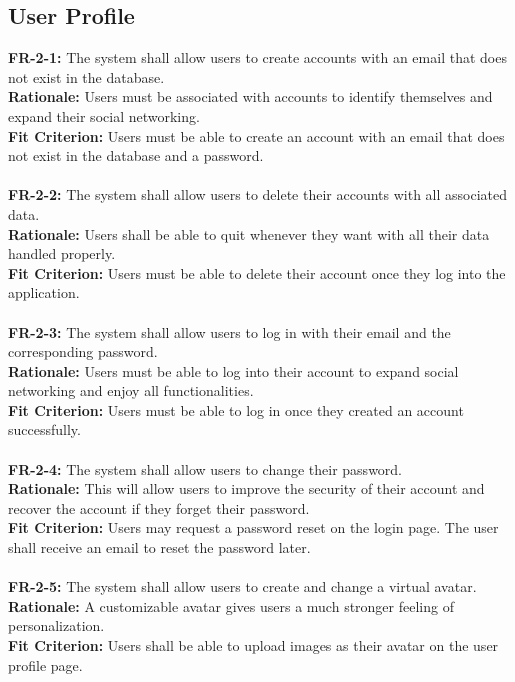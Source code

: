 \documentclass[12pt]{article}
\begin{document}
\subsection{User Profile}
    \textbf{FR-2-1:} The system shall allow users to create accounts with an email that does not exist in the database.\\
    \textbf{Rationale:} Users must be associated with accounts to identify themselves and expand their social networking.\\
    \textbf{Fit Criterion:} Users must be able to create an account with an email that does not exist in the database and a password.\\\\
    \textbf{FR-2-2:} The system shall allow users to delete their accounts with all associated data.\\
    \textbf{Rationale:} Users shall be able to quit whenever they want with all their data handled properly.\\
    \textbf{Fit Criterion:} Users must be able to delete their account once they log into the application.\\\\
    \textbf{FR-2-3:} The system shall allow users to log in with their email and the corresponding password.\\
    \textbf{Rationale:} Users must be able to log into their account to expand social networking and enjoy all functionalities.\\
    \textbf{Fit Criterion:} Users must be able to log in once they created an account successfully.\\\\
    \textbf{FR-2-4:} The system shall allow users to change their password.\\
    \textbf{Rationale:} This will allow users to improve the security of their account and recover the account if they forget their password.\\
    \textbf{Fit Criterion:} Users may request a password reset on the login page. The user shall receive an email to reset the password later.\\\\
     \textbf{FR-2-5:} The system shall allow users to create and change a virtual avatar.\\
    \textbf{Rationale:} A customizable avatar gives users a much stronger feeling of personalization. \\
    \textbf{Fit Criterion:} Users shall be able to upload images as their avatar on the user profile page.\\\\
\end{document}
